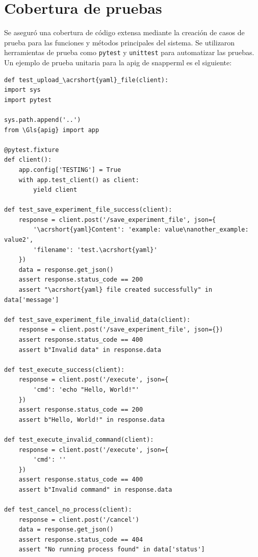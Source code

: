 \section{Cobertura de pruebas} Se aseguró una cobertura de código extensa mediante la creación de casos de prueba para las funciones y métodos principales del sistema. Se utilizaron herramientas de prueba como \texttt{pytest} y \texttt{unittest} para automatizar las pruebas. Un ejemplo de prueba unitaria para la \Gls{apig} de \Gls{snapperml} es el siguiente:

\begin{verbatim} 
def test_upload_\acrshort{yaml}_file(client):
import sys
import pytest

sys.path.append('..')
from \Gls{apig} import app

@pytest.fixture
def client():
    app.config['TESTING'] = True
    with app.test_client() as client:
        yield client

def test_save_experiment_file_success(client):
    response = client.post('/save_experiment_file', json={
        '\acrshort{yaml}Content': 'example: value\nanother_example: value2',
        'filename': 'test.\acrshort{yaml}'
    })
    data = response.get_json()
    assert response.status_code == 200
    assert "\acrshort{yaml} file created successfully" in data['message']

def test_save_experiment_file_invalid_data(client):
    response = client.post('/save_experiment_file', json={})
    assert response.status_code == 400
    assert b"Invalid data" in response.data

def test_execute_success(client):
    response = client.post('/execute', json={
        'cmd': 'echo "Hello, World!"'
    })
    assert response.status_code == 200
    assert b"Hello, World!" in response.data

def test_execute_invalid_command(client):
    response = client.post('/execute', json={
        'cmd': ''
    })
    assert response.status_code == 400
    assert b"Invalid command" in response.data

def test_cancel_no_process(client):
    response = client.post('/cancel')
    data = response.get_json()
    assert response.status_code == 404
    assert "No running process found" in data['status']

\end{verbatim}

